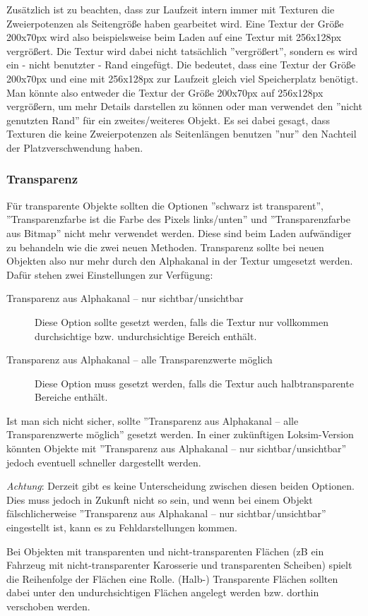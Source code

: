 Zusätzlich ist zu beachten, dass zur Laufzeit intern immer mit Texturen die Zweierpotenzen als Seitengröße haben gearbeitet wird. Eine Textur der Größe 200x70px wird also beispielsweise beim Laden auf eine Textur mit 256x128px vergrößert. Die Textur wird dabei nicht tatsächlich ''vergrößert'', sondern es wird ein - nicht benutzter - Rand eingefügt. Die bedeutet, dass eine Textur der Größe 200x70px und eine mit 256x128px zur Laufzeit gleich viel Speicherplatz benötigt. Man könnte also entweder die Textur der Größe 200x70px auf 256x128px vergrößern, um mehr Details darstellen zu können oder man verwendet den ''nicht genutzten Rand'' für ein zweites/weiteres Objekt. Es sei dabei gesagt, dass Texturen die keine Zweierpotenzen als Seitenlängen benutzen ''nur'' den Nachteil der Platzverschwendung haben.

\subsubsection{Transparenz}
Für transparente Objekte sollten die Optionen ''schwarz ist transparent'', ''Transparenzfarbe ist die Farbe des Pixels links/unten''  und ''Transparenzfarbe aus Bitmap'' nicht mehr verwendet werden. Diese sind beim Laden aufwändiger zu behandeln wie die zwei neuen Methoden. Transparenz sollte bei neuen Objekten also nur mehr durch den Alphakanal in der Textur umgesetzt werden. Dafür stehen zwei Einstellungen zur Verfügung:

\begin{description}
\item[Transparenz aus Alphakanal – nur sichtbar/unsichtbar]
Diese Option sollte gesetzt werden, falls die Textur nur vollkommen durchsichtige bzw. undurchsichtige Bereich enthält.
\item[Transparenz aus Alphakanal – alle Transparenzwerte möglich]
Diese Option muss gesetzt werden, falls die Textur auch halbtransparente Bereiche enthält.
\end{description}

Ist man sich nicht sicher, sollte ''Transparenz aus Alphakanal – alle Transparenzwerte möglich'' gesetzt werden. In einer zukünftigen Loksim-Version könnten Objekte mit ''Transparenz aus Alphakanal – nur sichtbar/unsichtbar'' jedoch eventuell schneller dargestellt werden.

\emph{Achtung}: Derzeit gibt es keine Unterscheidung zwischen diesen beiden Optionen. Dies  muss jedoch in Zukunft nicht so sein, und wenn bei einem Objekt fälschlicherweise ''Transparenz aus Alphakanal – nur sichtbar/unsichtbar'' eingestellt ist, kann es zu Fehldarstellungen kommen.

Bei Objekten mit transparenten und nicht-transparenten Flächen (zB ein Fahrzeug mit nicht-transparenter Karosserie und transparenten Scheiben) spielt die Reihenfolge der Flächen eine Rolle. (Halb-) Transparente Flächen sollten dabei unter den undurchsichtigen Flächen angelegt werden bzw. dorthin verschoben werden.


